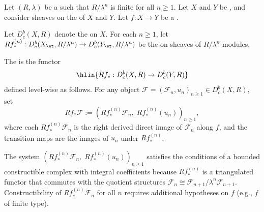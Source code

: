 \begin{definition} \label{definition:derived_direct_image_functor_on_bounded_constructible_complexes_with_integral_coefficients_on_a_noetherian_scheme}
Let $(R, \lambda)$ be a   such that $R/\lambda^n$ is finite for all $n \geq 1$. Let $X$ and $Y$ be , and consider sheaves on the  of $X$ and $Y$. Let $f: X \to Y$ be a .

Let $D_c^b(X, R)$ denote the  on $X$. For each $n \geq 1$, let $Rf_*^{(n)}: D_c^b(X_{\et}, R/\lambda^n) \to D_c^b(Y_{\et}, R/\lambda^n)$ be the  on sheaves of $R/\lambda^n$-modules.

The  is the functor
$$\hlin{Rf_* : D_c^b(X, R) \to D_c^b(Y, R)}$$
defined level-wise as follows. For any object $\mathcal{F} = (\mathcal{F}_n, u_n)_{n \geq 1} \in D_c^b(X, R)$, set
$$Rf_* \mathcal{F} := (Rf_*^{(n)} \mathcal{F}_n,\; Rf_*^{(n)}(u_n))_{n \geq 1},$$
where each $Rf_*^{(n)} \mathcal{F}_n$ is the right derived direct image of $\mathcal{F}_n$ along $f$, and the transition maps are the images of $u_n$ under $Rf_*^{(n)}$.

The system $(Rf_*^{(n)} \mathcal{F}_n,\; Rf_*^{(n)}(u_n))_{n \geq 1}$ satisfies the conditions of a bounded constructible complex with integral coefficients because $Rf_*^{(n)}$ is a triangulated functor that commutes with the quotient structures $\mathcal{F}_n \cong \mathcal{F}_{n+1}/\lambda^n \mathcal{F}_{n+1}$. Constructibility of $Rf_*^{(n)} \mathcal{F}_n$ for all $n$ requires additional hypotheses on $f$ (e.g., $f$ of finite type).
\end{definition}
